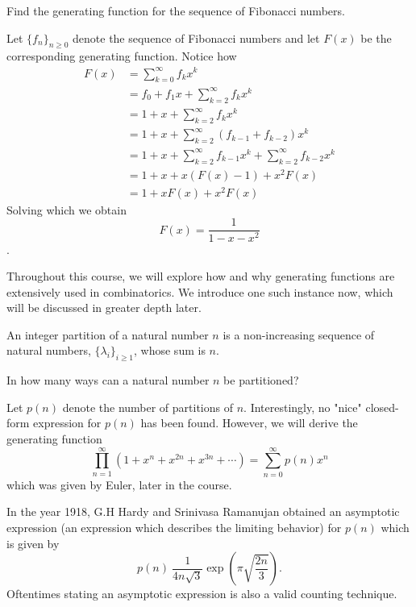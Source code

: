 \begin{question}
	Find the generating function for the sequence of Fibonacci numbers. 
 \label{q:1.9}
\end{question}
\begin{solution}
Let $\{f_{n}\}_{n \ge 0}$ denote the sequence of Fibonacci numbers and let $F\left( x \right)$ be the corresponding generating function. Notice how 
\begin{align*}
	F\left( x \right) &= \sum_{k=0}^{\infty} f_{k}x^k \\
	&= f_{0}+f_{1}x+\sum_{k=2}^{\infty}f_{k}x^k \\
	&= 1+x+\sum_{k=2}^{\infty}f_{k}x^k \\
	&= 1+x+\sum_{k=2}^\infty \left( f_{k-1}+f_{k-2} \right) x^k \\
	&= 1+x+\sum_{k=2}^{\infty} f_{k-1}x^k + \sum_{k=2}^{\infty} f_{k-2}x^k \\
	&= 1+x+x\left( F\left( x \right) -1 \right) + x^2F\left( x \right)  \\
	&= 1+xF\left( x \right)+x^2F\left( x \right)
\end{align*}
Solving which we obtain \[
F\left( x \right) = \frac{1}{1-x-x^2}
\].
\end{solution}
Throughout this course, we will explore how and why generating functions are extensively used in combinatorics. We introduce one such instance now, which will be discussed in greater depth later.
\begin{definition}
An integer partition of a natural number $n$ is a non-increasing sequence of natural numbers, $\{\lambda_i\}_{i \ge 1}$, whose sum is $n$.
\label{d:1.5}
\end{definition}
\begin{question}
In how many ways can a natural number $n$ be partitioned?
\end{question}
Let $p(n)$ denote the number of partitions of $n$. Interestingly, no "nice" closed-form expression for $p(n)$ has been found. However, we will derive the generating function \[
	\prod_{n=1}^\infty\left( 1+x^n +x^{2n}+x^{3n}+\cdots\right) =  \sum_{n=0}^{\infty}p\left( n \right) x^n
\] which was given by Euler, later in the course.
\begin{remark}
In the year 1918, G.H Hardy and Srinivasa Ramanujan obtained an asymptotic expression (an expression which describes the limiting behavior) for $p\left( n \right)$ which is given by \[
p\left( n \right) ~ \frac{1}{4n\sqrt{3}}\exp\left( \pi \sqrt{\frac{2n}{3}}  \right) .\] Oftentimes stating an asymptotic expression is also a valid counting technique.
\label{r:1.3}
\end{remark}
